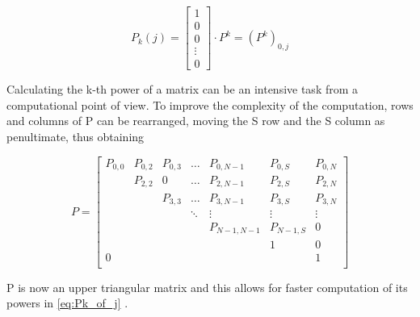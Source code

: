 \begin{equation}
P_{k}(j) = 
\begin{bmatrix}
1 \\
0 \\
0 \\
\vdots \\
0
\end{bmatrix}
\cdot P^{k} = (P^{k})_{0,j}
\label{eq:Pk_of_j}
\end{equation}
\hfill \break

Calculating the k-th power of a matrix can be an intensive task from a computational point of view. To improve the complexity of the computation, rows and columns of P can be rearranged, moving the S row and the S column as penultimate, thus obtaining

\begin{equation*}
P = 
\begin{bmatrix}
P_{0,0}	& P_{0,2}	& P_{0,3}  	& \dots	& P_{0, N-1}	& P_{0,S}	& P_{0,N} \\
		& P_{2,2}	& 0  	& \dots	& P_{2, N-1}	& P_{2,S}	& P_{2,N} \\
		& 			& P_{3,3}	& \dots	& P_{3, N-1}	& P_{3,S}	& P_{3,N} \\
 		& 			& 			& \ddots& \vdots		& \vdots	& \vdots \\
		& 			& 			& 		& P_{N-1,N-1}	& P_{N-1,S}	& 0\\
		& 			& 			& 		& 				& 1			& 0		 \\
0		& 			& 		  	& 		& 				& 			& 1		 \\
\end{bmatrix}
\label{triangularPMatrix}
\end{equation*}
\hfill \break

P is now an upper triangular matrix and this allows for faster computation of its powers in \ref{eq:Pk_of_j} .


